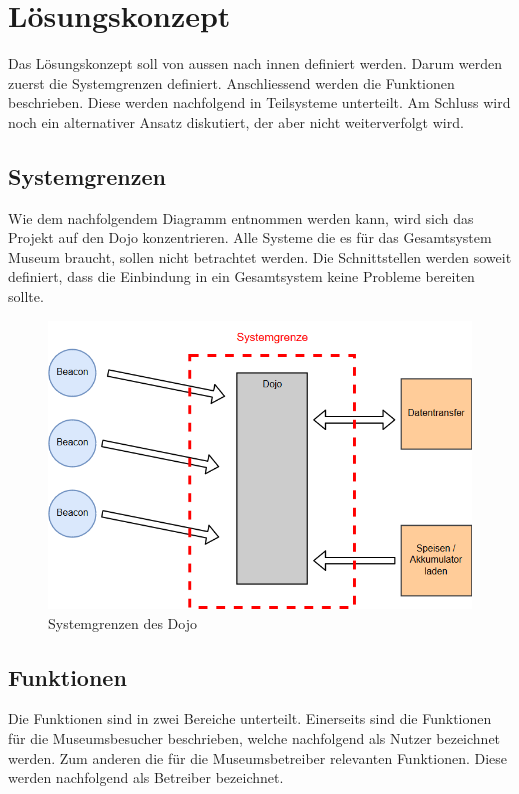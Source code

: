 \section{Lösungskonzept}
Das Lösungskonzept soll von aussen nach innen definiert werden. Darum werden zuerst die Systemgrenzen definiert. Anschliessend werden die Funktionen beschrieben. Diese werden nachfolgend in Teilsysteme unterteilt. Am Schluss wird noch ein alternativer Ansatz diskutiert, der aber nicht weiterverfolgt wird.

\subsection{Systemgrenzen}
Wie dem nachfolgendem Diagramm entnommen werden kann, wird sich das Projekt auf den Dojo konzentrieren. Alle Systeme die es für das Gesamtsystem Museum braucht, sollen nicht betrachtet werden. Die Schnittstellen werden soweit definiert, dass die Einbindung in ein Gesamtsystem keine Probleme bereiten sollte.

\begin{figure}[H]
\begin{center}
	\includegraphics[width=140mm]{data/Loesungskonzept_Systemgrenzen.png}
	\caption{Systemgrenzen des Dojo} %
	\label{fig:first_layer}
\end{center}
\end{figure}

\subsection{Funktionen}
Die Funktionen sind in zwei Bereiche unterteilt. Einerseits sind die Funktionen für die Museumsbesucher beschrieben, welche nachfolgend als Nutzer bezeichnet werden. Zum anderen die für die Museumsbetreiber relevanten Funktionen. Diese werden nachfolgend als Betreiber bezeichnet.
